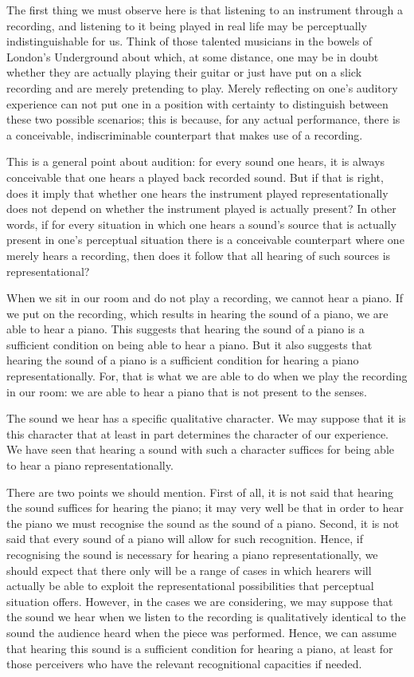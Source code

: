 \documentclass[sloppy, journal, git, bytitle, dodraft]{humapap}
\begin{document}
The first thing we must observe here is that listening to an instrument through a recording, and listening to it being played in real life may be perceptually indistinguishable for us. Think of those talented musicians in the bowels of London's Underground about which, at some distance, one may be in doubt whether they are actually playing their guitar or just have put on a slick recording and are merely pretending to play. Merely reflecting on one's auditory experience can not put one in a position with certainty to distinguish between these two possible scenarios; this is because, for any actual performance, there is a conceivable, indiscriminable counterpart that makes use of a recording. 

This is a general point about audition: for every sound one hears, it is always conceivable that one hears a played back recorded sound. But if that is right, does it imply that whether one hears the instrument played representationally does not depend on whether the instrument played is actually present? In other words, if for every situation in which one hears a sound's source that is actually present in one's perceptual situation there is a conceivable counterpart where one merely hears a recording, then does it follow that all hearing of such sources is representational? 


When we sit in our room and do not play a recording, we cannot hear a piano. If we put on the recording, which results in hearing the sound of a piano, we are able to hear a piano. This suggests that hearing the sound of a piano is a sufficient condition on being able to hear a piano. But it also suggests that hearing the sound of a piano is a sufficient condition for hearing a piano representationally. For, that is what we are able to do when we play the recording in our room: we are able to hear a piano that is not present to the senses.

The sound we hear has a specific qualitative character. We may suppose that it is this character that at least in part determines the character of our experience. We have seen that hearing a sound with such a character suffices for being able to hear a piano representationally. 

There are two points we should mention. First of all, it is not said that hearing the sound suffices for hearing the piano; it may very well be that in order to hear the piano we must recognise the sound as the sound of a piano. Second, it is not said that every sound of a piano will allow for such recognition. Hence, if recognising the sound is necessary for hearing a piano representationally, we should expect that there only will be a range of cases in which hearers will actually be able to exploit the representational possibilities that perceptual situation offers. However, in the cases we are considering, we may suppose that the sound we hear when we listen to the recording is qualitatively identical to the sound the audience heard when the piece was performed. Hence, we can assume that hearing this sound is a sufficient condition for hearing a piano, at least for those perceivers who have the relevant recognitional capacities if needed. 
\end{document}
